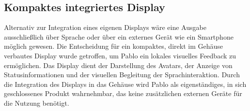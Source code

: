 \subsection{Kompaktes integriertes Display}

Alternativ zur Integration eines eigenen Displays wäre eine Ausgabe ausschließlich über Sprache oder über ein externes Gerät wie ein Smartphone möglich gewesen.
Die Entscheidung für ein kompaktes, direkt im Gehäuse verbautes Display wurde getroffen, um Pablo ein lokales visuelles Feedback zu ermöglichen.
Das Display dient der Darstellung des Avatars, der Anzeige von Statusinformationen und der visuellen Begleitung der Sprachinteraktion.
Durch die Integration des Displays in das Gehäuse wird Pablo als eigenständiges, in sich geschlossenes Produkt wahrnehmbar, das keine zusätzlichen externen Geräte für die Nutzung benötigt.